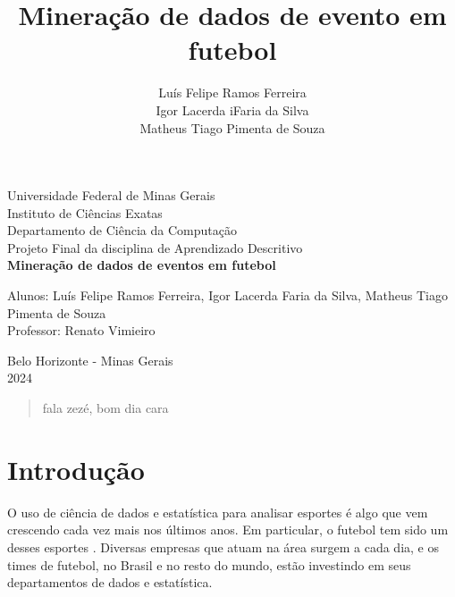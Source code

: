 \documentclass{article}
\begin{document}
\begin{titlepage}
	\begin{center}
		{\large Universidade Federal de Minas Gerais}\\[0.2cm]
		{\large Instituto de Ciências Exatas}\\[0.2cm]
		{\large Departamento de Ciência da Computação}\\[0.2cm]
		{\large Projeto Final da disciplina de Aprendizado
		Descritivo}\\[5.1cm]
		{\large \bf Mineração de dados de eventos em futebol}\\[5.1cm]
	\end{center}
	{\large Alunos: Luís Felipe Ramos Ferreira, Igor Lacerda Faria da
	Silva,
	Matheus Tiago Pimenta de Souza}\\[0.7cm]
	{\large Professor: Renato Vimieiro}\\[5.1cm]
	\begin{center}
		{\large Belo Horizonte - Minas Gerais}\\[0.2cm]
		{\large 2024}
	\end{center}
\end{titlepage}

\newpage
\begin{quote}
	fala zezé, bom dia cara
\end{quote}

\newpage
\renewcommand{\contentsname}{Sumário}
\tableofcontents
\newpage

\title{Mineração de dados de evento em futebol}
\author{Luís Felipe Ramos Ferreira \\  Igor Lacerda iFaria da Silva \\ Matheus
	Tiago Pimenta de Souza}

\maketitle

\section{Introdução}

O uso de ciência de dados e estatística para analisar esportes é algo que vem
crescendo cada vez mais nos últimos anos. Em
particular, o futebol tem sido um desses
esportes \cite{takvorian2021beautiful}. Diversas empresas que atuam na
área surgem a cada dia, e os times de futebol, no Brasil e no resto do
mundo, estão investindo em seus departamentos de dados e estatística.
\end{document}
